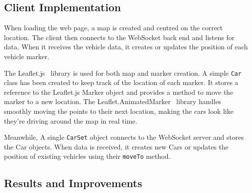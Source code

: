 \documentclass[ %
                    author={Alexander Hill},
                supervisor={Dr. Benjamin Sach},
                    degree={MEng},
                     title={MARMOSET},
                  subtitle={Multi-Agent Route Management using Online Simulation for Efficient Transportation},
                      type={research},
                      year={2016} ]{dissertation}
\begin{document}
\subsection{Client Implementation}

When loading the web page, a map is created and centred on the correct
location.  The client then connects to the WebSocket back end and listens for
data. When it receives the vehicle data, it creates or updates the position of
each vehicle marker.

The Leaflet.js~\cite{leaflet} library is used for both map and marker creation.
A simple \texttt{Car} class has been created to keep track of the location of
each marker. It stores a reference to the Leaflet.js Marker object and provides
a method to move the marker to a new location. The
Leaflet.AnimatedMarker~\cite{animarker} library handles smoothly moving the
points to their next location, making the cars look like they're driving around
the map in real time.

Meanwhile, A single \texttt{CarSet} object connects to the WebSocket server and
stores the Car objects. When data is received, it creates new Cars or updates
the position of existing vehicles using their \texttt{moveTo} method.

\subsection{Results and Improvements}
\end{document}
